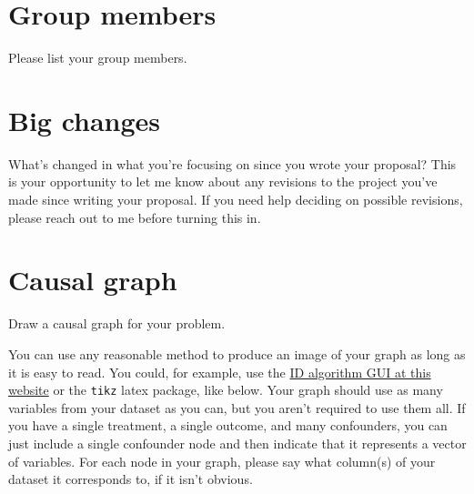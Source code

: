 \documentclass[12pt]{article}
\begin{document}
\clearpage

\section{Group members}

\noindent Please list your group members.

\section{Big changes}

What's changed in what you're focusing on since you wrote your proposal?  This
is your opportunity to let me know about any revisions to the project you've
made since writing your proposal. If you need help deciding on possible
revisions, please reach out to me before turning this in.

\section{Causal graph} \label{sec:graph}

\noindent Draw a causal graph for your problem.

You can use any reasonable method to produce an image of your graph as long as
it is easy to read.  You could, for example, use the
\href{https://aci-esp.shinyapps.io/shiny-short-example/}{ID algorithm GUI at
this website} or the {\tt tikz} latex package, like below.  Your graph should
use as many variables from your dataset as you can, but you aren't required to
use them all. If you have a single treatment, a single outcome, and many
confounders, you can just include a single confounder node and then indicate
that it represents a vector of variables. For each node in your graph, please
say what column(s) of your dataset it corresponds to, if it isn't obvious.

\vspace{1em}

\end{document}

